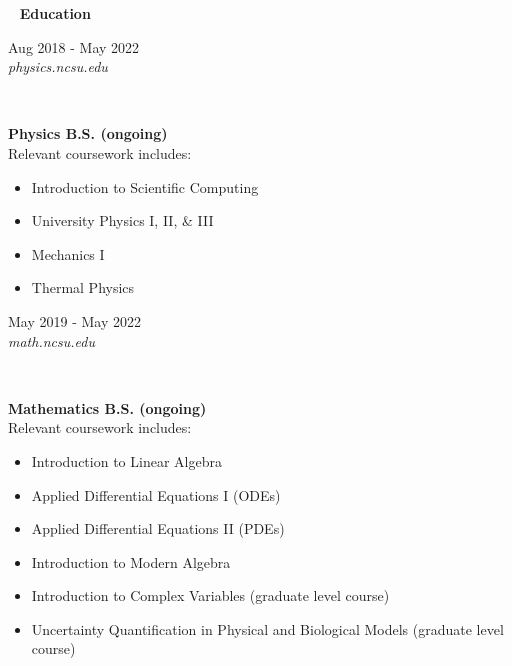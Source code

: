 \documentclass[8pt]{article}
\def \margin{0.5in}
\def \primarycolor   {spacecadet}
\def \tertiarycolor  {airforceblue} %
\def \titlerectmin{0.15cm}
\def \titlerectmax{0.35cm}
\def \leftcolwidth{3.05cm}
\newcommand{\cvheader}[1]{
    \tikz{\fill [\primarycolor] (0,\titlerectmin) rectangle (\leftcolwidth,\titlerectmax);} \ 
    \textcolor{\primarycolor}{ \large{\textbf{#1}} } 
}
\newcommand{\cventry}[4]{
    \begin{minipage}[t]{\leftcolwidth} 
        \small{
            \begin{flushright}
                #2\\
                \textcolor{\tertiarycolor}{\textit{#4}}
            \end{flushright}
        }
    \end{minipage} \ \
    \begin{minipage}[t]{\linewidth-\leftcolwidth} \normalsize{\textbf{#1} \\ #3} \end{minipage}
} %
\def \headerheight{2in}
\begin{document}

\vskip -\margin \vskip \headerheight

\cvheader{Education}

\cventry{Physics B.S. (ongoing)}{Aug 2018 - May 2022}{Relevant coursework includes: 
    \begin{itemize}
        \item{Introduction to Scientific Computing}
        \item{University Physics I, II, \& III}
        \item{Mechanics I}
        \item{Thermal Physics}
    \end{itemize}
}{physics.ncsu.edu}


\cventry{Mathematics B.S. (ongoing)}{May 2019 - May 2022}{Relevant coursework includes:
    \begin{itemize}
        \item{Introduction to Linear Algebra}
        \item{Applied Differential Equations I (ODEs)}
        \item{Applied Differential Equations II (PDEs)}
        \item{Introduction to Modern Algebra}
        \item{Introduction to Complex Variables (graduate level course)}
        \item{Uncertainty Quantification in Physical and Biological Models (graduate level course)} %
    \end{itemize}
}{math.ncsu.edu}
\end{document}
